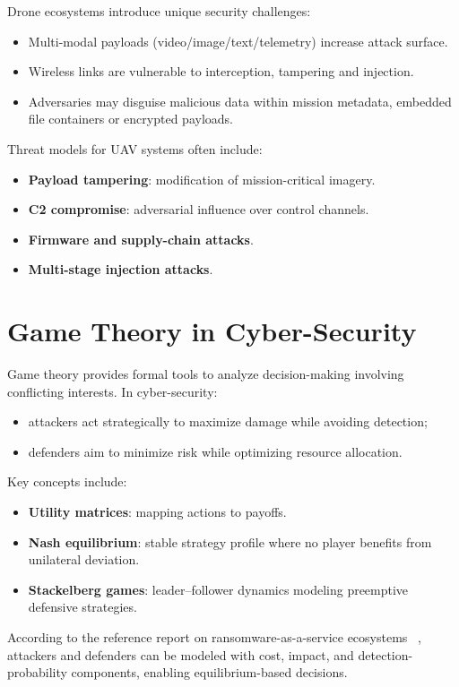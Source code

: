 \documentclass[12pt, a4paper]{report}
\begin{document}
Drone ecosystems introduce unique security challenges:
\begin{itemize}
    \item Multi-modal payloads (video/image/text/telemetry) increase attack
          surface.
    \item Wireless links are vulnerable to interception, tampering and injection.
    \item Adversaries may disguise malicious data within mission metadata,
          embedded file containers or encrypted payloads.
\end{itemize}

Threat models for UAV systems often include:
\begin{itemize}
    \item \textbf{Payload tampering}: modification of mission-critical imagery.
    \item \textbf{C2 compromise}: adversarial influence over control channels.
    \item \textbf{Firmware and supply-chain attacks}.
    \item \textbf{Multi-stage injection attacks}.
\end{itemize}
\section{Game Theory in Cyber-Security}

Game theory provides formal tools to analyze decision-making involving
conflicting interests. In cyber-security:
\begin{itemize}
    \item attackers act strategically to maximize damage while avoiding detection;
    \item defenders aim to minimize risk while optimizing resource allocation.
\end{itemize}

Key concepts include:
\begin{itemize}
    \item \textbf{Utility matrices}: mapping actions to payoffs.
    \item \textbf{Nash equilibrium}: stable strategy profile where no player
          benefits from unilateral deviation.
    \item \textbf{Stackelberg games}: leader–follower dynamics modeling preemptive
          defensive strategies.
\end{itemize}

According to the reference report on ransomware-as-a-service ecosystems%
~\cite{raas-report}, attackers and defenders can be modeled with cost,
impact, and detection-probability components, enabling equilibrium-based
decisions.
\end{document}
